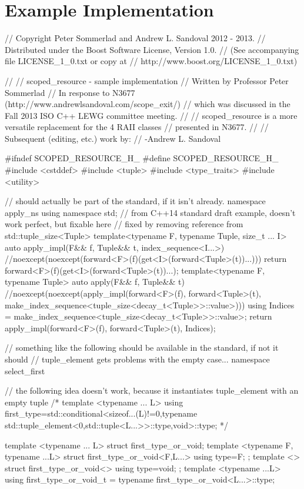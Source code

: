 \documentclass[ebook,11pt,article]{memoir}
\begin{document}
\pnum
\returns {}



\chapter{Example Implementation}
\begin{codeblock}
// Copyright Peter Sommerlad and Andrew L. Sandoval 2012 - 2013.
// Distributed under the Boost Software License, Version 1.0.
//   (See accompanying file LICENSE_1_0.txt or copy at
//         http://www.boost.org/LICENSE_1_0.txt)

//
// scoped_resource - sample implementation
// Written by Professor Peter Sommerlad
// In response to N3677 (http://www.andrewlsandoval.com/scope_exit/)
// which was discussed in the Fall 2013 ISO C++ LEWG committee meeting.
//
// scoped_resource is a more versatile replacement for the 4 RAII classes
// presented in N3677.
//
// Subsequent (editing, etc.) work by:
// -Andrew L. Sandoval


#ifndef SCOPED_RESOURCE_H_
#define SCOPED_RESOURCE_H_
#include <cstddef>
#include <tuple>
#include <type_traits>
#include <utility>

// should actually be part of the standard, if it isn't already.
namespace apply_ns{
using namespace std;
// from C++14 standard draft example, doesn't work perfect, but fixable here
// fixed by removing reference from std::tuple_size<Tuple>
template<typename F, typename Tuple, size_t ... I>
auto apply_impl(F&& f, Tuple&& t, index_sequence<I...>)
//noexcept(noexcept(forward<F>(f)(get<I>(forward<Tuple>(t))...)))
{
	return forward<F>(f)(get<I>(forward<Tuple>(t))...);
}
template<typename F, typename Tuple>
auto apply(F&& f, Tuple&& t)
//noexcept(noexcept(apply_impl(forward<F>(f), forward<Tuple>(t), make_index_sequence<tuple_size<decay_t<Tuple>>::value>{})))
{
  using Indices = make_index_sequence<tuple_size<decay_t<Tuple>>::value>;
  return apply_impl(forward<F>(f), forward<Tuple>(t), Indices{});
}
}

// something like the following should be available in the standard, if not it should
// tuple_element gets problems with the empty case...
namespace select_first{
// the following idea doesn't work, because it instantiates tuple_element with an empty tuple
/*
template <typename ... L>
using first_type=std::conditional<sizeof...(L)!=0,typename std::tuple_element<0,std::tuple<L...>>::type,void>::type;
 */

template <typename ... L> struct first_type_or_void;
template <typename F, typename ...L>
struct first_type_or_void<F,L...>{
	using type=F;
};
template <> struct first_type_or_void<>{
	using type=void;
};
template <typename ...L>
using first_type_or_void_t = typename first_type_or_void<L...>::type;
}


\end{codeblock}
\end{document}
